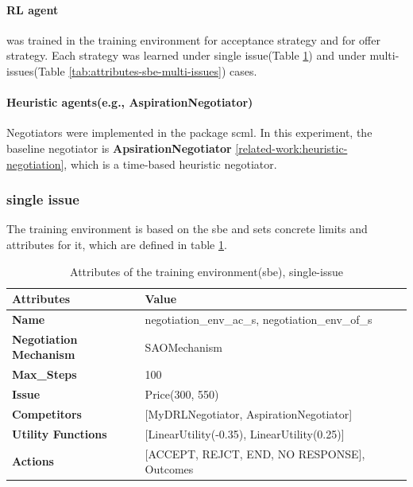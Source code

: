 \paragraph{RL agent} was trained in the training environment for acceptance strategy and for offer strategy. Each strategy was learned under single issue(Table \ref{tab:attributes-sbe}) and under multi-issues(Table \ref{tab:attributes-sbe-multi-issues}) cases. 

\paragraph{Heuristic agents(e.g., AspirationNegotiator)} Negotiators were implemented in the package scml. In this experiment, the baseline negotiator is \textbf{ApsirationNegotiator} \ref{related-work:heuristic-negotiation}, which is a time-based heuristic negotiator.

\subsubsection{single issue}
The training environment is based on the \gls{sbe} and sets concrete limits and attributes for it, which are defined in table \ref{tab:attributes-sbe}.

\begin{table}[htbp]
\centering
\begin{tabular}{l l l} \toprule
\bfseries \textbf{Attributes}      & \bfseries \textbf{Value}             \\ \midrule
\textbf{Name}                    & negotiation\_env\_ac\_s, negotiation\_env\_of\_s \\
\textbf{Negotiation Mechanism}   & SAOMechanism                                        \\
\textbf{Max\_Steps}              & 100                                                 \\
\textbf{Issue}             	     & Price(300, 550)                                     \\
\textbf{Competitors}             & [MyDRLNegotiator, AspirationNegotiator]             \\
\textbf{Utility Functions}       & [LinearUtility(-0.35), LinearUtility(0.25)]         \\
\textbf{Actions}                 & [ACCEPT, REJCT, END, NO RESPONSE], Outcomes\\
\bottomrule
\end{tabular}
\caption{Attributes of the training environment(sbe), single-issue}
\label{tab:attributes-sbe}
\end{table}

